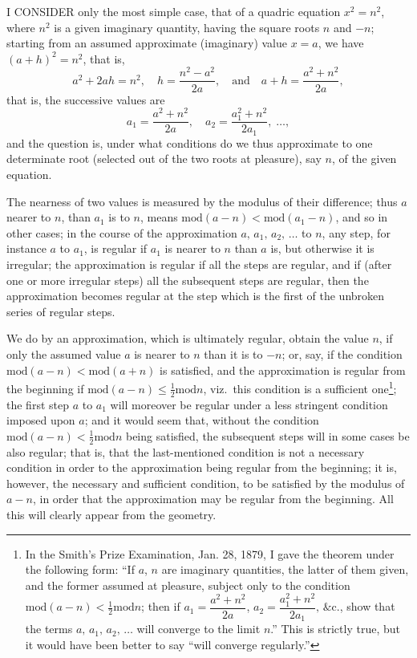 \documentclass[11pt]{article}
\providecommand{\modd}{\mathrm{mod}}
\begin{document}
\bigskip

I CONSIDER only the most simple case, that of a quadric equation $x^2 = n^2$, where
$n^2$ is a given imaginary quantity, having the square roots $n$ and $-n$; starting from
an assumed approximate (imaginary) value $x = a$, we have $(a + h)^2 = n^2$, that is,
\[
   a^2 + 2ah = n^2,\quad h = \frac{n^2 - a^2}{2a},\quad\text{and}\quad a + h = \frac{a^2 + n^2}{2a},
\]
that is, the successive values are
\[
   a_1 = \frac{a^2 + n^2}{2a},\quad a_2 = \frac{a_1^2 + n^2}{2a_1},\;\ldots,
\]
and the question is, under what conditions do we thus approximate to one determinate
root (selected out of the two roots at pleasure), say $n$, of the given equation.

The nearness of two values is measured by the modulus of their difference;
thus $a$ nearer to $n$, than $a_1$ is to $n$, means $\modd(a - n) < \modd(a_1 - n)$, and so in
other cases; in the course of the approximation $a,\,a_1,\,a_2,\,\ldots$ to $n$, any step, for
instance $a$ to $a_1$, is regular if $a_1$ is nearer to $n$ than $a$ is, but otherwise it is
irregular; the approximation is regular if all the steps are regular, and if (after one
or more irregular steps) all the subsequent steps are regular, then the approximation
becomes regular at the step which is the first of the unbroken series of regular
steps.

We do by an approximation, which is ultimately regular, obtain the value $n$, if
only the assumed value $a$ is nearer to $n$ than it is to $-n$; or, say, if the condition
$\modd(a - n) < \modd(a + n)$ is satisfied, and the approximation is regular from the beginning
if $\modd(a - n) \leqslant \tfrac{1}{2}\modd n$, viz.\ this condition is a sufficient one\footnote{In the Smith's Prize Examination, Jan. 28, 1879, I gave the theorem under the following form: ``If $a$, $n$ are imaginary quantities, the latter of them given, and the former assumed at pleasure, subject only to the condition $\modd(a - n) < \tfrac{1}{2}\modd n$; then if $a_1 = \dfrac{a^2 + n^2}{2a}$, $a_2 = \dfrac{a_1^2 + n^2}{2a_1},\,\&$c., show that the terms $a,\,a_1,\,a_2,\,\ldots$ will converge to the limit $n$.'' This is strictly true, but it would have been better to say ``will converge regularly.''}; the first step $a$ to $a_1$
will moreover be regular under a less stringent condition imposed upon $a$; and it would
seem that, without the condition $\modd(a - n) < \tfrac{1}{2}\modd n$ being satisfied, the subsequent
steps will in some cases be also regular; that is, that the last-mentioned condition
is not a necessary condition in order to the approximation being regular from the
beginning; it is, however, the necessary and sufficient condition, to be satisfied by the
modulus of $a - n$, in order that the approximation may be regular from the beginning.
All this will clearly appear from the geometry.
\end{document}
